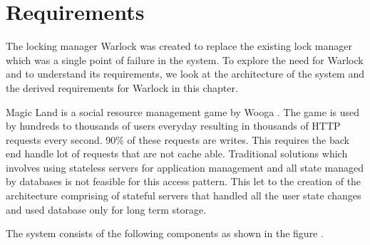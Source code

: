 \chapter{Requirements}
\label{chapter:requirements}

The locking manager Warlock was created to replace the existing lock manager
which was a single point of failure in the system. To explore the need for
Warlock and to understand its requirements, we look at the architecture of
the system and the derived requirements for Warlock in this chapter.

Magic Land \citep{magicland} is a social%
resource management game by Wooga%
. The game is used by hundreds to thousands of users everyday resulting in
thousands of HTTP requests every second. 90\% of these requests are writes.
This requires the back end%
handle lot of requests that are not cache able. Traditional solutions which
involves using stateless servers for application management and all state managed
by databases is not feasible for this access pattern. This let to the creation
of the architecture comprising of stateful servers that handled all the user
state changes and used database only for long term storage.

The system consists of the following components as shown in the figure
.

